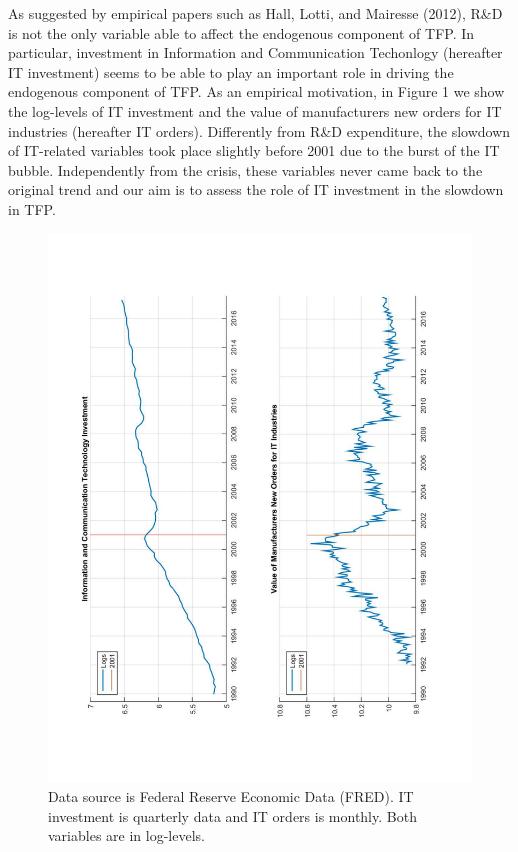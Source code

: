 \documentclass{article}
\begin{document}
	As suggested by empirical papers such as Hall, Lotti, and Mairesse (2012), R\&D is not the only variable able to affect the endogenous component of TFP. In particular, investment in Information and Communication Techonlogy (hereafter IT investment) seems to be able to play an important role in driving the endogenous component of TFP. As an empirical motivation, in Figure 1 we show the log-levels of IT investment and the value of manufacturers new orders for IT industries (hereafter IT orders). Differently from R\&D expenditure, the slowdown of IT-related variables took place slightly before 2001 due to the burst of the IT bubble. Independently from the crisis, these variables never came back to the original trend and our aim is to assess the role of IT investment in the slowdown in TFP.
	
	\begin{figure}
		\centering
		\includegraphics[scale=0.5, angle =270]{motivation}
		\caption{Data source is Federal Reserve Economic Data (FRED). IT investment is quarterly data and IT orders is monthly. Both variables are in log-levels.}
	\end{figure}	
\end{document}
